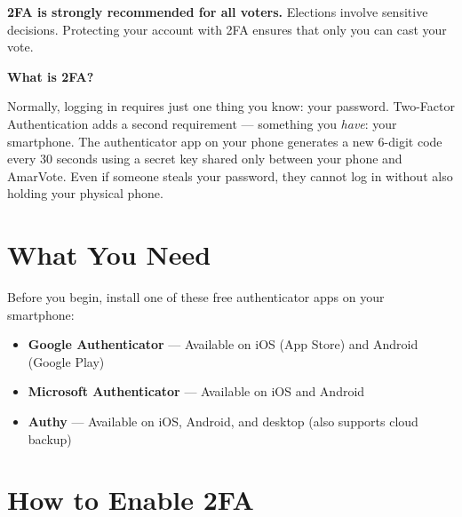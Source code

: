 \documentclass[12pt,a4paper,openany]{book}
\begin{document}
\begin{tcolorbox}[warnbox]
	\textbf{2FA is strongly recommended for all voters.} Elections involve sensitive decisions. Protecting your account with 2FA ensures that only you can cast your vote.
\end{tcolorbox}

\begin{tcolorbox}[conceptbox]
	\textbf{What is 2FA?}

	Normally, logging in requires just one thing you know: your password. Two-Factor Authentication adds a second requirement --- something you \emph{have}: your smartphone. The authenticator app on your phone generates a new 6-digit code every 30 seconds using a secret key shared only between your phone and AmarVote. Even if someone steals your password, they cannot log in without also holding your physical phone.
\end{tcolorbox}

\section{What You Need}

Before you begin, install one of these free authenticator apps on your smartphone:

\begin{itemize}
	\item \textbf{Google Authenticator} --- Available on iOS (App Store) and Android (Google Play)
	\item \textbf{Microsoft Authenticator} --- Available on iOS and Android
	\item \textbf{Authy} --- Available on iOS, Android, and desktop (also supports cloud backup)
\end{itemize}

\section{How to Enable 2FA}
\end{document}
